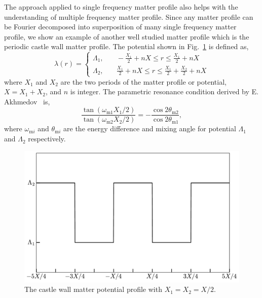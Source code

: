 \documentclass[%
reprint,
 amsmath,amssymb,
 aps,
]{revtex4-1}
\begin{document}
The approach applied to single frequency matter profile also helps with the understanding of multiple frequency matter profile. Since any matter profile can be Fourier decomposed into superposition of many single frequency matter profile, we show an example of another well studied matter profile which is the periodic castle wall matter profile. The potential shown in Fig.~\ref{fig-castlewall-profile-illustration} is defined as,
\begin{equation}
    \lambda(r) = \begin{cases} 
\Lambda_1, &\quad -\frac{X_1}{2}+nX\le r\le \frac{X_1}{2}+nX \\
\Lambda_2, &\quad \frac{X_1}{2}+nX\le r\le \frac{X_1}{2}+\frac{X_2}{2} +nX
\end{cases}
\label{eq-castle-wall-potential}
\end{equation}
where $X_1$ and $X_2$ are the two periods of the matter profile or potential, $X=X_1+X_2$, and $n$ is integer. The parametric resonance condition derived by E. Akhmedov~\cite{Akhmedov2000} is,
\begin{equation}
    \frac{\tan (\omega_{\mathrm m1}X_1/2)}{\tan (\omega_{\mathrm m2}X_2/2)} = - \frac{\cos 2\theta_{\mathrm m2}}{\cos 2\theta_{\mathrm m1}},
\end{equation}
where $\omega_{\mathrm{m}i}$ and $\theta_{\mathrm{m}i}$ are the energy difference and mixing angle for potential $\Lambda_1$ and $\Lambda_2$ respectively.

\begin{figure}
    \centering
    \includegraphics[width=\columnwidth]{assets/castlewall-profile}
    \caption{The castle wall matter potential profile with $X_1=X_2=X/2$.}
    \label{fig-castlewall-profile-illustration}
\end{figure}
\end{document}
